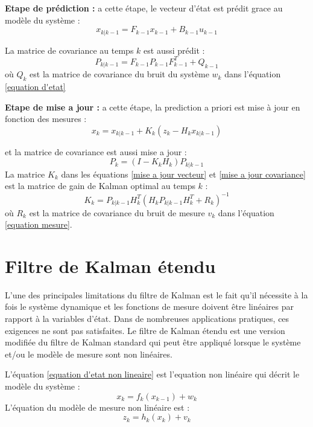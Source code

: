 \documentclass[a4paper,11pt]{StyleThese}
\begin{document}
\textbf{Etape de prédiction :} a cette étape, le vecteur d'état est prédit grace au modèle du système : 
\begin{equation}
  x_{k|k-1} = F_{k-1} x_{k-1} + B_{k-1}u_{k-1}
\end{equation}

La matrice de covariance au temps $k$ est aussi prédit : 
\begin{equation}
  P_{k|k-1} = F_{k-1}P_{k-1}F^T_{k-1} + Q_{k-1} 
\end{equation}
où $Q_k$ est la matrice de covariance du bruit du système $w_k$ dans l'équation \ref{equation d'etat}


\textbf{Etape de mise a jour :} a cette étape, la prediction a priori est mise à jour en fonction des mesures : 
\begin{equation}
  x_{k} = x_{k|k-1} + K_k(z_k - H_kx_{k|k-1})
  \label{mise a jour vecteur}
\end{equation}

et la matrice de covariance est aussi mise a jour : 
\begin{equation}
  P_k = (I-K_kH_k)P_{k|k-1}
  \label{mise a jour covariance}
\end{equation}
La matrice $K_k$ dans les équations \ref{mise a jour vecteur} et \ref{mise a jour covariance} est la matrice de gain de Kalman optimal au temps $k$ : 
\begin{equation}
  K_k = P_{k|k-1}H_k^T(H_kP_{k|k-1}H_k^T + R_k)^{-1}
\end{equation}
où $R_k$ est la matrice de covariance du bruit de mesure $v_k$ dans l'équation \ref{equation mesure}.
\section{Filtre de Kalman étendu}
L'une des principales limitations du filtre de Kalman est le fait qu'il nécessite à la fois
le système dynamique et les fonctions de mesure doivent être linéaires par rapport à la
variables d'état. Dans de nombreuses applications pratiques, ces exigences ne sont pas satisfaites.
Le filtre de Kalman étendu est une version modifiée du filtre de Kalman standard qui
peut être appliqué lorsque le système et/ou le modèle de mesure sont non linéaires.

L'équation \ref{equation d'etat non lineaire} est l'equation non linéaire qui décrit le modèle du système :
\begin{equation}
  x_k = f_k(x_{k-1}) + w_k
  \label{equation d'etat non lineaire}
\end{equation}
L'équation du modèle de mesure non linéaire est :
\begin{equation}
  z_k = h_k(x_k) + v_k
\end{equation}
\end{document}
